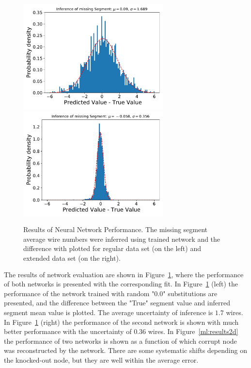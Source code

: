 \documentclass[12pt]{article}
\begin{document}
\begin{figure}[!ht]
\begin{center}
 \includegraphics[width=3.0in]{images/figure_r.pdf}
 \includegraphics[width=3.0in]{images/figure_n.pdf}
\caption {Results of Neural Network Performance. The missing segment average wire numbers were inferred using trained network and the difference with plotted for regular data set (on the left) and extended data set (on the right). }
 \label{ml:results}
 \end{center}
\end{figure}

The results of network evaluation are shown in Figure~\ref{ml:results}, where the performance of both networks is presented with the corresponding fit. In Figure~\ref{ml:results} (left) the performance of the network trained with random "0.0" substitutions are presented, and the difference between the "True" segment value and inferred segment mean value is plotted. The average uncertainty of inference is $1.7$ wires. In Figure~\ref{ml:results} (right) the performance of the second network is shown with much better performance with the uncertainty of $0.36$ wires. In Figure~\ref{ml:results2d}  the performance of two networks is shown as a function of which corrupt node was reconstructed by the network. There are some systematic shifts depending on the knocked-out node, but they are well within the average error.
\end{document}
